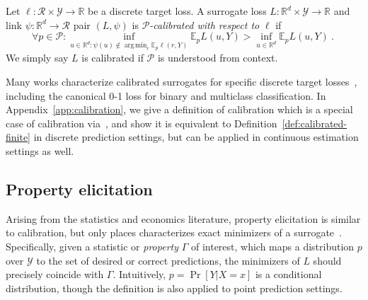 \documentclass[anon,12pt]{colt2021} %
\newcommand{\Comments}{1}
\newcommand{\mytodo}[2]{\ifnum\Comments=1%
	\todo[linecolor=#1!80!black,backgroundcolor=#1,bordercolor=#1!80!black]{#2}\fi}
\newcommand{\jessiet}[1]{\mytodo{purple!20!white}{JF: #1}}
\newcommand{\reals}{\mathbb{R}}
\newcommand{\E}{\mathbb{E}}
\newcommand{\R}{\mathcal{R}}
\renewcommand{\P}{\mathcal{P}}
\newcommand{\Y}{\mathcal{Y}}
\newcommand{\exploss}[3]{\E_{#3} #1(#2,Y)}
\DeclareMathOperator*{\argmin}{arg\,min}
\begin{document}
\begin{definition}[Calibrated]\label{def:calibrated-finite}
	Let $\ell : \R \times \Y \to \reals$ be a discrete target loss.
	A surrogate loss $L : \reals^d \times \Y \to \reals$  and link $\psi:\reals^d \to \R$ pair $(L, \psi)$ is \emph{$\P$-calibrated with respect to} $\ell$ if 
	\begin{equation}\label{eq:calibration}
	\forall p \in \P: \inf_{u \in \reals^d : \psi(u) \not \in \argmin_r \E_p\ell(r,Y)} \exploss{L}{u}{p} > \inf_{u \in \reals^d} \exploss{L}{u}{p}~.~
	\end{equation}
	We simply say $L$ is calibrated if $\P$ is understood from context.
\end{definition}

Many works characterize calibrated surrogates for specific discrete target losses~\citep{zhang2004statistical,lin2004note,bartlett2006convexity,tewari2007consistency}, including the canonical 0-1 loss for binary and multiclass classification.
In Appendix~\ref{app:calibration}, we give a definition of calibration which is a special case of calibration via~\citet{steinwart2008support}, and show it is equivalent to Definition~\ref{def:calibrated-finite} in discrete prediction settings, but can be applied in continuous estimation settings as well.


\subsection{Property elicitation}\label{subsec:properties}
Arising from the statistics and economics literature, property elicitation is similar to calibration, but only places characterizes exact minimizers of a surrogate~\citep{savage1971elicitation,osband1985information-eliciting,lambert2008eliciting,lambert2009eliciting,lambert2018elicitation,frongillo2015vector-valued,frongillo2014general}.
Specifically, given a statistic or \emph{property} $\Gamma$ of interest, which maps a distribution $p$ over $\Y$ to the set of desired or correct predictions, the minimizers of $L$ should precisely coincide with $\Gamma$.
Intuitively, $p = \Pr[Y|X=x]$ is a conditional distribution, though the definition is also applied to point prediction settings.
\end{document}
